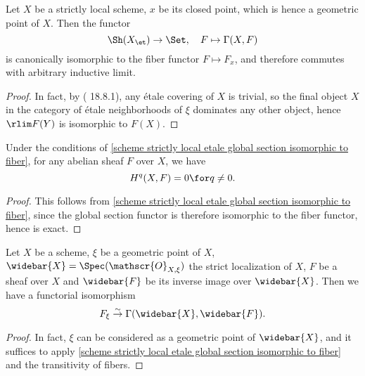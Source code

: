 \begin{proposition}\label{scheme strictly local etale global section isomorphic to fiber}
Let $X$ be a strictly local scheme, $x$ be its closed point, which is hence a geometric point of $X$. Then the functor
\[\Sh(X_\et)\to\Set,\quad F\mapsto\Gamma(X,F)\]
is canonically isomorphic to the fiber functor $F\mapsto F_x$, and therefore commutes with arbitrary inductive limit.
\end{proposition}
\begin{proof}
In fact, by (\cite{EGA4-4} 18.8.1), any \'etale covering of $X$ is trivial, so the final object $X$ in the category of \'etale neighborhoods of $\xi$ dominates any other object, hence $\rlim F(Y)$ is isomorphic to $F(X)$.
\end{proof}

\begin{corollary}\label{scheme strictly local etale cohomology trivial}
Under the conditions of \cref{scheme strictly local etale global section isomorphic to fiber}, for any abelian sheaf $F$ over $X$, we have
\[H^q(X,F)=0\for q\neq 0.\]
\end{corollary}
\begin{proof}
This follows from \cref{scheme strictly local etale global section isomorphic to fiber}, since the global section functor is therefore isomorphic to the fiber functor, hence is exact.
\end{proof}

\begin{corollary}\label{scheme strictly local fiber and inverse image section}
Let $X$ be a scheme, $\xi$ be a geometric point of $X$, $\widebar{X}=\Spec(\mathscr{O}_{X,\xi})$ the strict localization of $X$, $F$ be a sheaf over $X$ and $\widebar{F}$ be its inverse image over $\widebar{X}$. Then we have a functorial isomorphism
\[F_\xi\stackrel{\sim}{\to}\Gamma(\widebar{X},\widebar{F}).\]
\end{corollary}
\begin{proof}
In fact, $\xi$ can be considered as a geometric point of $\widebar{X}$, and it suffices to apply \cref{scheme strictly local etale global section isomorphic to fiber} and the transitivity of fibers.
\end{proof}


